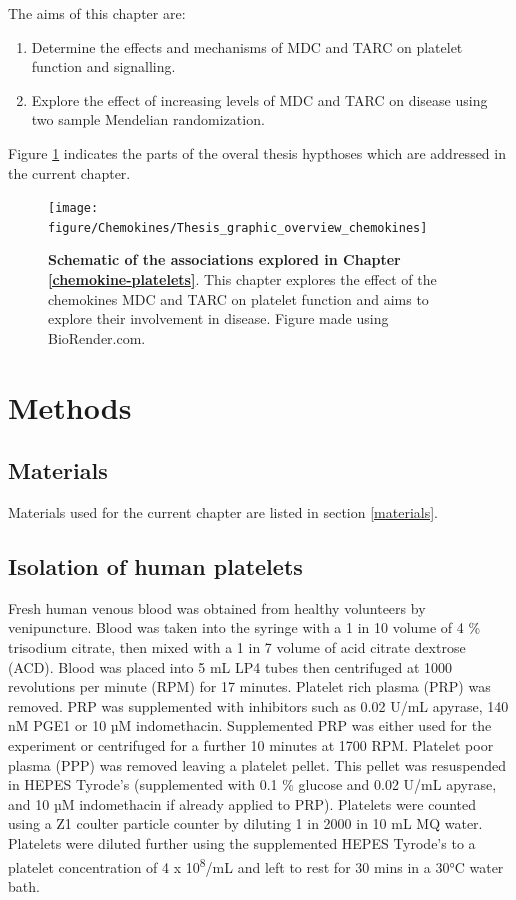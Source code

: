 \documentclass[11pt,twoside]{bristolthesis}
\providecommand{\tightlist}{%
  \setlength{\itemsep}{0pt}\setlength{\parskip}{0pt}}
\begin{document}
The aims of this chapter are:
\begin{enumerate}
\def\labelenumi{\arabic{enumi})}
\tightlist
\item
  Determine the effects and mechanisms of MDC and TARC on platelet function and signalling.
\item
  Explore the effect of increasing levels of MDC and TARC on disease using two sample Mendelian randomization.
\end{enumerate}
Figure \ref{fig:chemokine-platelet-graphic} indicates the parts of the overal thesis hypthoses which are addressed in the current chapter.



\begin{figure}
\texttt{[image: figure/Chemokines/Thesis\_graphic\_overview\_chemokines]} \caption[Schematic of the associations explored in Chapter \ref{chemokine-platelets}]{\textbf{Schematic of the associations explored in Chapter \ref{chemokine-platelets}}. This chapter explores the effect of the chemokines MDC and TARC on platelet function and aims to explore their involvement in disease. Figure made using BioRender.com.}\label{fig:chemokine-platelet-graphic}
\end{figure}
\hypertarget{methods-1}{%
\section{Methods}\label{methods-1}}

\hypertarget{materials-1}{%
\subsection{Materials}\label{materials-1}}

Materials used for the current chapter are listed in section \ref{materials}.

\hypertarget{isolation-of-human-platelets}{%
\subsection{Isolation of human platelets}\label{isolation-of-human-platelets}}

Fresh human venous blood was obtained from healthy volunteers by venipuncture. Blood was taken into the syringe with a 1 in 10 volume of 4 \% trisodium citrate, then mixed with a 1 in 7 volume of acid citrate dextrose (ACD). Blood was placed into 5 mL LP4 tubes then centrifuged at 1000 revolutions per minute (RPM) for 17 minutes. Platelet rich plasma (PRP) was removed. PRP was supplemented with inhibitors such as 0.02 U/mL apyrase, 140 nM PGE1 or 10 µM indomethacin. Supplemented PRP was either used for the experiment or centrifuged for a further 10 minutes at 1700 RPM. Platelet poor plasma (PPP) was removed leaving a platelet pellet. This pellet was resuspended in HEPES Tyrode's (supplemented with 0.1 \% glucose and 0.02 U/mL apyrase, and 10 µM indomethacin if already applied to PRP). Platelets were counted using a Z1 coulter particle counter by diluting 1 in 2000 in 10 mL MQ water. Platelets were diluted further using the supplemented HEPES Tyrode's to a platelet concentration of 4 x 10\textsuperscript{8}/mL and left to rest for 30 mins in a 30°C water bath.
\end{document}
